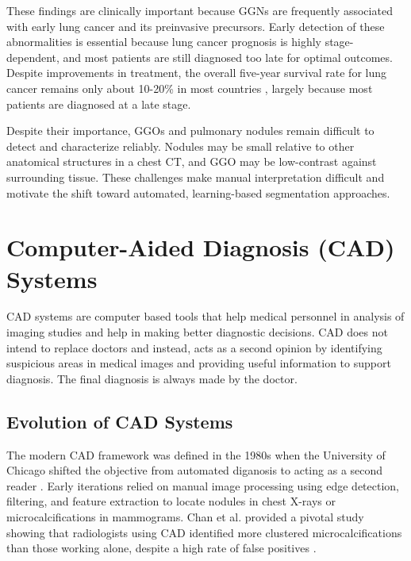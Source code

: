 These findings are clinically important because GGNs are frequently associated with early lung cancer and its preinvasive precursors.
Early detection of these abnormalities is essential because lung cancer prognosis is highly stage-dependent, and most patients are
still diagnosed too late for optimal outcomes. Despite improvements in treatment, the overall five-year survival rate for lung
cancer remains only about 10-20\% in most countries \cite{allemani2018global}, largely because most patients are diagnosed at a late stage.

Despite their importance, GGOs and pulmonary nodules remain difficult to detect and characterize reliably.
Nodules may be small relative to other anatomical structures in a chest CT, and GGO may be low-contrast against surrounding tissue.
These challenges make manual interpretation difficult and motivate the shift toward automated, learning-based segmentation approaches.


\section{Computer-Aided Diagnosis (CAD) Systems}

CAD systems are computer based tools that help medical personnel in analysis of imaging studies
and help in making better diagnostic decisions. CAD does not intend to replace doctors and instead, acts as a second opinion
by identifying suspicious areas in medical images and providing useful information to support diagnosis. The final
diagnosis is always made by the doctor\cite{CAD2007}.

\subsection{Evolution of CAD Systems}

The modern CAD framework was defined in the 1980s when the University of Chicago shifted the objective from automated diganosis
to acting as a second reader \cite{CAD2007}.
Early iterations relied on manual image processing using edge detection, filtering, and feature extraction to
locate nodules in chest X-rays or microcalcifications in mammograms. Chan et al. provided a pivotal study showing
that radiologists using CAD identified more clustered microcalcifications than those working alone, despite a high
rate of false positives \cite{doi:10.2214/AJR.04.1300}.


